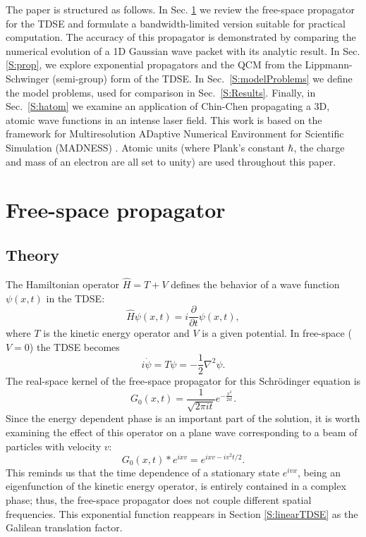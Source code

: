 \documentclass[review,letterpaper]{elsarticle}
\begin{document}
The paper is structured as follows. In Sec. \ref{S:freeProp} we review the free-space
propagator for the TDSE and formulate a bandwidth-limited version suitable for practical computation.
The accuracy of this propagator is demonstrated by comparing the numerical
evolution of a 1D Gaussian wave packet with its analytic result.
In Sec. \ref{S:prop}, we explore exponential propagators
and the QCM from the Lippmann-Schwinger (semi-group) form of the TDSE.
In Sec.~\ref{S:modelProblems} we define the model problems,
used for comparison in Sec.~\ref{S:Results}.
Finally, in Sec.~\ref{S:hatom} we examine an application
of Chin-Chen \cite{Chin:2001vs} propagating a 3D, atomic wave functions in an intense laser field.
This work is based on the framework for Multiresolution ADaptive Numerical
Environment for Scientific Simulation (MADNESS) \cite{madnessDOC}.
Atomic units (where Plank's constant $\hbar$, the charge and mass of an
electron are all set to unity) are used throughout this paper.




\section{Free-space propagator}
\label{S:freeProp}

\subsection{Theory}
The Hamiltonian operator $\hat{H} = T+V$ defines the behavior of a wave function
$\psi (x,t)$ in the TDSE:
\begin{equation}
\hat{H}\psi (x,t)=i\frac{\partial }{\partial t}\psi (x,t),
\label{E:tdse}
\end{equation}
where $T$ is the kinetic energy operator and $V$ is a given potential.
In free-space ($V=0$) the TDSE becomes
\begin{equation}
i\dot{\psi } = T \psi = -{\frac{1}{2}}\nabla ^{2}\psi .
\end{equation}
The real-space kernel of the free-space propagator for this Schr\"odinger equation is
\begin{equation}
G_{0}(x,t)=\frac{1}{\sqrt{2\pi it}}e^{-{\frac{x^{2}}{2it}}}.
\end{equation}
Since the energy dependent phase is an important part of the solution, it is worth
examining the effect of this operator on a plane wave corresponding to a beam of
particles with velocity $v$:
\begin{equation}
G_{0}(x,t)\ast e^{ixv}=e^{ixv-iv^{2}t/2}.
\end{equation}
This reminds us that the time dependence of a stationary state $e^{ivx}$, being an
eigenfunction of the kinetic energy operator, is entirely contained in a complex phase;
thus, the free-space propagator does not couple different spatial frequencies. This
exponential function reappears in Section \ref{S:linearTDSE} as the Galilean
translation factor.
\end{document}
